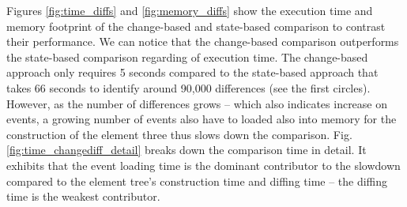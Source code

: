 \documentclass{jot}
\begin{document}
Figures \ref{fig:time_diffs} and \ref{fig:memory_diffs} show the execution time and memory footprint of the change-based and state-based comparison to contrast their performance. We can notice that the change-based comparison outperforms the state-based comparison regarding of execution time. The change-based approach only requires 5 seconds compared to the state-based approach that takes 66 seconds to identify around 90,000 differences (see the first circles). However, as the number of differences grows -- which also indicates increase on events, a growing number of events also have to loaded also into memory for the construction of the element three thus slows down the comparison. Fig. \ref{fig:time_changediff_detail} breaks down the comparison time in detail. It exhibits that the event loading time is the dominant contributor to the slowdown compared to the element tree's construction time and diffing time -- the diffing time is the weakest contributor. 
\end{document}
